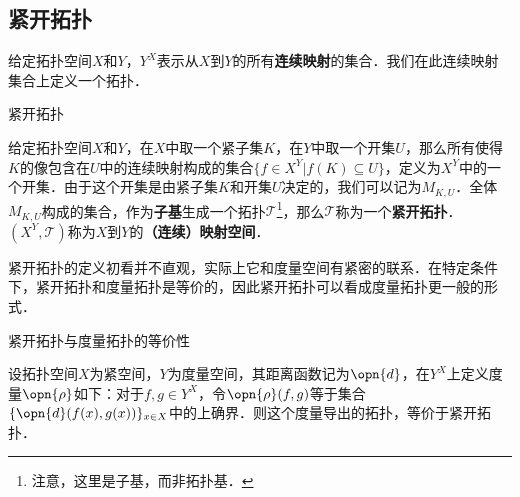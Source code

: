 
\subsection{紧开拓扑}

给定拓扑空间$X$和$Y$，$Y^X$表示从$X$到$Y$的所有\textbf{连续映射}的集合．我们在此连续映射集合上定义一个拓扑．

\begin{definition}{紧开拓扑}

给定拓扑空间$X$和$Y$，在$X$中取一个紧子集$K$，在$Y$中取一个开集$U$，那么所有使得$K$的像包含在$U$中的连续映射构成的集合$\{f\in X^Y|f(K)\subseteq U\}$，定义为$X^Y$中的一个开集．由于这个开集是由紧子集$K$和开集$U$决定的，我们可以记为$M_{K, U}$．全体$M_{K, U}$构成的集合，作为\textbf{子基}生成一个拓扑$\mathcal{T}$\footnote{注意，这里是子基，而非拓扑基．}，那么$\mathcal{T}$称为一个\textbf{紧开拓扑}．$(X^Y, \mathcal{T})$称为$X$到$Y$的\textbf{（连续）映射空间}．

\end{definition}

紧开拓扑的定义初看并不直观，实际上它和度量空间有紧密的联系．在特定条件下，紧开拓扑和度量拓扑是等价的，因此紧开拓扑可以看成度量拓扑更一般的形式．

\begin{theorem}{紧开拓扑与度量拓扑的等价性}

设拓扑空间$X$为紧空间，$Y$为度量空间，其距离函数记为$\opn{d}$，在$Y^X$上定义度量$\opn{\rho}$如下：对于$f, g\in Y^X$，令$\opn{\rho}(f, g)$等于集合$\{\opn{d}(f(x), g(x))\}_{x\in X}$中的上确界．则这个度量导出的拓扑，等价于紧开拓扑．

\end{theorem}

